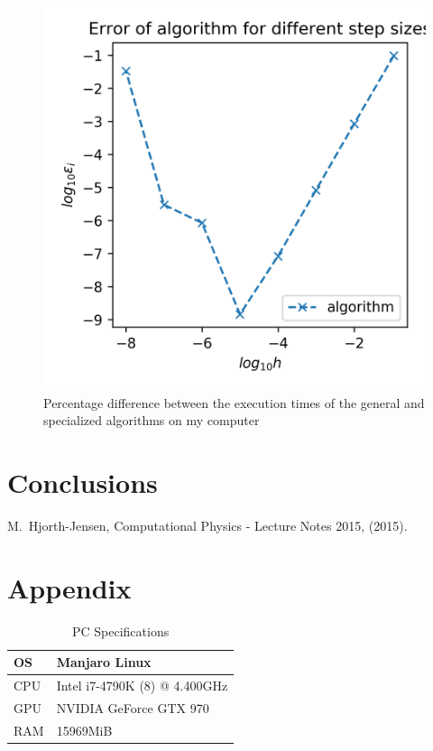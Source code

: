 \documentclass[10pt,showpacs,preprintnumbers,footinbib,amsmath,amssymb,aps,prl,twocolumn,groupedaddress,superscriptaddress,showkeys]{revtex4-1}
\begin{document}
  \begin{figure}[hbtp]
    \center
    \includegraphics[scale=.7]{figs/ex1e_err.png}
    \caption{Percentage difference between the execution times of the general and specialized algorithms on my computer}
  \end{figure}






\section{Conclusions}

\begin{thebibliography}{99}
 M.~Hjorth-Jensen, Computational Physics - Lecture Notes 2015, (2015).
\end{thebibliography}

\newpage

\appendix
  \section{Appendix}
  \begin{table}[h]
  \caption{PC Specifications}
  \begin{tabular}{|l|l|}
    \hline
    OS & Manjaro Linux \\ \hline
    CPU & Intel i7-4790K (8) @ 4.400GHz \\ \hline
    GPU & NVIDIA GeForce GTX 970  \\ \hline
    RAM & 15969MiB \\ \hline
  \end{tabular}
  \label{tab:specs}
  \end{table}
\end{document}
